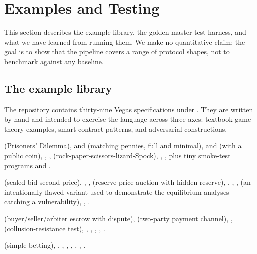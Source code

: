 \section{Examples and Testing}
\label{sec:evaluation}

This section describes the example library, the golden-master
test harness, and what we have learned from running them.  We
make no quantitative claim: the goal is to show that the
pipeline covers a range of protocol shapes, not to benchmark
against any baseline.

\subsection{The example library}

The repository contains thirty-nine Vegas specifications under
.  They are written by hand and intended to
exercise the language across three axes: textbook game-theory
examples, smart-contract patterns, and adversarial constructions.

\begin{description}\itemsep2pt
\item[Classical games.]
   (Prisoners' Dilemma),
   and  (matching
    pennies, full and minimal),
   and  (with a
    public coin),
  ,
  ,
   (rock-paper-scissors-lizard-Spock),
  ,
  ,
  plus tiny smoke-test programs  and
    .

\item[Mechanism design.]
   (sealed-bid second-price),
  ,
  ,
   (reserve-price auction with hidden
    reserve),
  , ,
  ,
   (an intentionally-flawed
    variant used to demonstrate the equilibrium analyses
    catching a vulnerability),
  ,
  .

\item[Smart-contract patterns.]
   (buyer/seller/arbiter escrow with
    dispute),
   (two-party payment channel),
  ,
   (collusion-resistance test),
  ,
  ,
  ,
  ,
  .

\item[Adversarial / structural.]
   (simple betting),
  ,
  ,
  ,
  ,
  ,
  ,
  .
\end{description}

